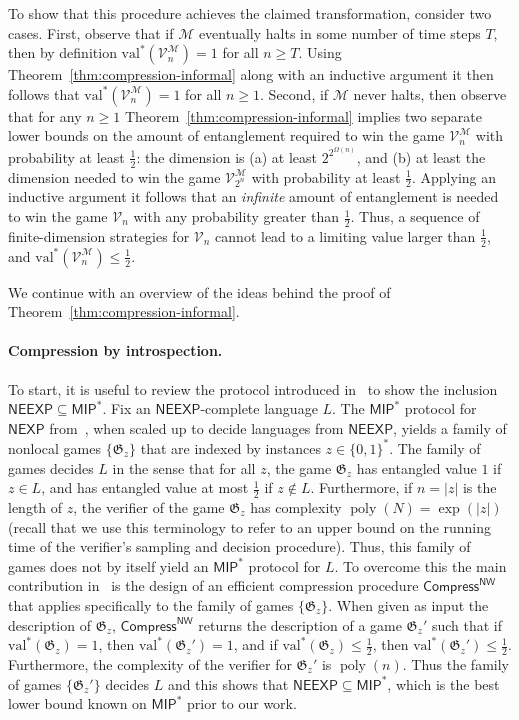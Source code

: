 \documentclass[11pt]{article}
\theoremstyle{definition}
\DeclareMathOperator{\poly}{poly}
\newcommand{\val}{\ensuremath{\mathrm{val}}}
\newcommand{\game}{\mathfrak{G}}
\newcommand{\verifier}{\mathcal{V}}
\newcommand{\class}[1]{\ensuremath{\mathsf{#1}}\xspace}
\newcommand{\NEXP}{\class{NEXP}} %
\newcommand{\MIP}{\class{MIP}} %
\newcommand{\NEEXP}{\class{NEEXP}} %
\newcommand{\machine}{\cal{M}}
\renewcommand{\cal}[1]{\mathcal{#1}}
\begin{document}
To show that this procedure achieves the claimed transformation, consider two cases. First, observe that if $\cal{M}$ eventually halts in some number of time steps $T$, then by definition $\val^*(\verifier^\machine_n) = 1$ for all $n\geq T$. Using Theorem~\ref{thm:compression-informal} along with an inductive argument it then follows that $\val^*(\verifier^\machine_n) = 1$ for all $n \geq 1$. Second, if $\cal{M}$ never halts, then observe that for any $n\geq 1$ Theorem~\ref{thm:compression-informal} implies two separate lower bounds on the amount of entanglement required to win the game $\verifier^\machine_n$ with probability at least $\frac{1}{2}$: the dimension is (a) at least $2^{2^{\Omega(n)}}$, and (b) at least the dimension needed to win the game $\verifier^\machine_{2^n}$ with probability at least $\frac{1}{2}$. Applying an inductive argument it follows that an \emph{infinite} amount of entanglement is needed to win the game $\verifier_n$ with any probability greater than $\frac{1}{2}$. Thus, a sequence of finite-dimension strategies for $\verifier_n$ cannot lead to a limiting value larger than $\frac{1}{2}$, and $\val^*(\verifier^\machine_n) \leq \frac{1}{2}$. 

We continue with an overview of the ideas behind the proof of Theorem~\ref{thm:compression-informal}.

\newcommand{\CompressNW}{\mathsf{Compress}^{\mathsf{NW}}}
 
\paragraph{Compression by introspection.}
To start, it is useful to review the protocol introduced in~\cite{NW19} to show
the inclusion $\NEEXP \subseteq \MIP^*$.
Fix an $\NEEXP$-complete language $L$.
The $\MIP^*$ protocol for $\NEXP$ from~\cite{natarajan2018two}, when scaled up
to decide languages from $\NEEXP$, yields a family of nonlocal games $\{ \game_z
\}$ that are indexed by instances $z \in \{0,1\}^*$.
The family of games decides $L$ in the sense that for all $z$, the game
$\game_z$ has entangled value $1$ if $z \in L$, and has entangled value at most
$\frac{1}{2}$ if $z \notin L$.
Furthermore, if $n = |z|$ is the length of $z$, the verifier of the game
$\game_z$ has complexity $\poly(N)=\exp(|z|)$ (recall that we use this
terminology to refer to an upper bound on the running time of the verifier's
sampling and decision procedure).
Thus, this family of games does not by itself yield an $\MIP^*$ protocol for
$L$.
To overcome this the main contribution in~\cite{NW19} is the design of an
efficient compression procedure $\CompressNW$ that applies specifically to the
family of games $\{\game_z \}$.
When given as input the description of $\game_z$, $\CompressNW$ returns the
description of a game $\game_z'$ such that if $\val^*(\game_z) = 1$, then
$\val^*(\game_z') = 1$, and if $\val^*(\game_z) \leq \frac{1}{2}$, then
$\val^*(\game_z') \leq \frac{1}{2}$.
Furthermore, the complexity of the verifier for $\game_z'$ is $\poly(n)$.
Thus the family of games $\{ \game_z' \}$ decides $L$ and this shows that
$\NEEXP \subseteq \MIP^*$, which is the best lower bound known on $\MIP^*$
prior to our work.
  
\end{document}
